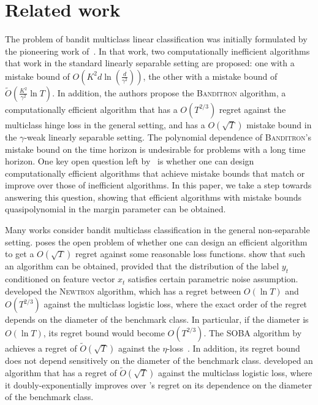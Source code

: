 \section{Related work}
\label{section:related-work}

The problem of bandit multiclass linear classification was initially formulated
by the pioneering work of~\cite{Kakade-Shalev-Shwartz-Tewari-2008}. In that
work, two computationally inefficient algorithms that work in the standard
linearly separable setting are proposed: one with a mistake bound of $O(K^2 d
\ln(\frac{d}{\gamma^2}))$, the other with a mistake bound of
$\widetilde{O}(\frac{K^2}{\gamma^2} \ln T)$. In addition, the authors propose
the \textsc{Banditron} algorithm, a computationally efficient algorithm that has
a $O(T^{2/3})$ regret against the multiclass hinge loss
in the general setting, and has a $O(\sqrt{T})$ mistake
bound in the $\gamma$-weak linearly separable setting. The polynomial dependence
of \textsc{Banditron}'s mistake bound on the time horizon is undesirable for
problems with a long time horizon. One key open question left
by~\cite{Kakade-Shalev-Shwartz-Tewari-2008} is whether one can design
computationally efficient algorithms that achieve mistake bounds that match or
improve over those of inefficient algorithms. In this paper, we take a step
towards answering this question, showing that efficient algorithms with mistake
bounds quasipolynomial in the margin parameter can be obtained.


Many works consider bandit multiclass classification in the general
non-separable setting. \cite{Abernethy-Rakhlin-2009} poses the open problem of
whether one can design an efficient algorithm to get a $O(\sqrt{T})$ regret
against some reasonable loss functions. \cite{Crammer-Gentile-2013} show that
such an algorithm can be obtained, provided that the distribution of
the label $y_t$ conditioned on feature vector $x_t$ satisfies certain parametric
noise assumption. \cite{Hazan-Kale-2011} developed the \textsc{Newtron}
algorithm, which has a regret between $O(\ln T)$ and $O(T^{2/3})$ against the
multiclass logistic loss, where the exact order of the regret depends on the
diameter of the benchmark class. In particular, if the diameter is $O(\ln T)$,
its regret bound would become $O(T^{2/3})$. The \textsc{SOBA} algorithm by
\cite{Beygelzimer-Orabona-Zhang-2017} achieves a regret of
$\widetilde{O}(\sqrt{T})$ against the
$\eta$-loss~\cite{Orabona-Cesa-Bianchi-Gentile-2012}. In addition, its regret
bound does not depend sensitively on the diameter of the benchmark class.
\cite{Foster-Kale-Luo-Mohri-Sridharan-2018} developed an algorithm that has a
regret of $\widetilde{O}(\sqrt{T})$ against the multiclass logistic loss, where
it doubly-exponentially improves over \cite{Hazan-Kale-2011}'s regret on its
dependence on the diameter of the benchmark class.

